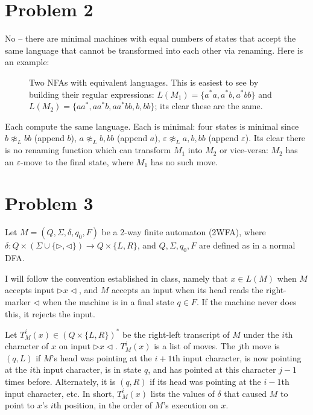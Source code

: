 \documentclass[11pt]{article}
\begin{document}
\section*{Problem 2}
No -- there are minimal machines with equal numbers of states that accept the same language that cannot be transformed into each other via renaming. Here is an example:

\begin{figure}[h]
\begin{center}\scalebox{.7}{}\end{center}
\caption{Two NFAs with equivalent languages. This is easiest to see by building their regular expressions: $L(M_1) = \{ a^*a, a^*b, a^*bb \}$ and $L(M_2) = \{ aa^*, aa^*b, aa^*bb, b, bb \}$; its clear these are the same.}
\end{figure}

Each compute the same language. Each is minimal: four states is minimal since $b \not \approx_L bb$ (append $b$), $a \not \approx_L b, bb$ (append $a$), $\varepsilon \not \approx_L a, b, bb$ (append $\varepsilon$). Its clear there is no renaming function which can transform $M_1$ into $M_2$ or vice-versa: $M_2$ has an $\varepsilon$-move to the final state, where $M_1$ has no such move.

\pagebreak
\section*{Problem 3}
Let $M = (Q, \Sigma, \delta, q_0, F)$ be a 2-way finite automaton (2WFA), where $\delta: Q \times (\Sigma \cup \{ \rhd, \lhd \}) \to Q \times \{L,R\}$, and $Q, \Sigma, q_0, F$ are defined as in a normal DFA.

I will follow the convention established in class, namely that $x \in L(M)$ when $M$ accepts input $\rhd x \lhd$, and $M$ accepts an input when its head reads the right-marker $\lhd$ when the machine is in a final state $q \in F$. If the machine never does this, it rejects the input.

\begin{definition}
Let $T_M^i(x) \in (Q \times \{L,R\})^*$ be the right-left transcript of $M$ under the $i$th character of $x$ on input $\rhd x \lhd$. $T_M^i(x)$ is a list of moves. The $j$th move is $(q,L)$ if $M$'s head was pointing at the $i+1$th input character, is now pointing at the $i$th input character, is in state $q$, and has pointed at this character $j-1$ times before. Alternately, it is $(q,R)$ if its head was pointing at the $i-1$th input character, etc. In short, $T_M^i(x)$ lists the values of $\delta$ that caused $M$ to point to $x$'s $i$th position, in the order of $M$'s execution on $x$. 
\end{definition}
\end{document}
